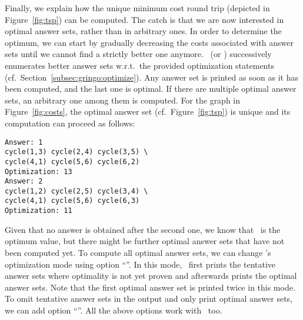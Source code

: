 Finally, we explain how the unique minimum cost round trip
(depicted in Figure~\ref{fig:tsp}) can be computed.
The catch is that we are now interested in optimal answer sets,
rather than in arbitrary ones.
In order to determine the optimum, we can start by gradually
decreasing the costs associated with answer sets
until we cannot find a strictly better one anymore.
\clasp\ (or \clingo) successively enumerates better answer sets
w.r.t.\ the provided optimization statements (cf.\ Section~\ref{subsec:gringo:optimize}).
Any answer set is printed as soon as it has been computed,
and the last one is optimal.
If there are multiple optimal answer sets, an arbitrary one among them is computed.
For the graph in Figure~\ref{fig:costs},
the optimal answer set (cf.\ Figure~\ref{fig:tsp}) is unique
and its computation can proceed as follows:%
%
\begin{lstlisting}[numbers=none]
Answer: 1
cycle(1,3) cycle(2,4) cycle(3,5) \
cycle(4,1) cycle(5,6) cycle(6,2)
Optimization: 13
Answer: 2
cycle(1,2) cycle(2,5) cycle(3,4) \
cycle(4,1) cycle(5,6) cycle(6,3)
Optimization: 11
\end{lstlisting}
%
Given that no answer is obtained after the second one,
we know that~ is the optimum value,
but there might be further optimal answer sets that have not been computed yet.
To compute all optimal answer sets,
we can change \clasp's optimization mode using option
``\code{--opt-mode=optN}''.
In this mode, \clasp\ first prints the tentative answer sets where optimality is not yet proven and afterwards prints the optimal answer sets.
Note that the first optimal answer set is printed twice in this mode.
To omit tentative answer sets in the output and only print optimal answer sets,
we can add option ``\code{--quiet=1}''.
All the above options work with \clingo\ too.

